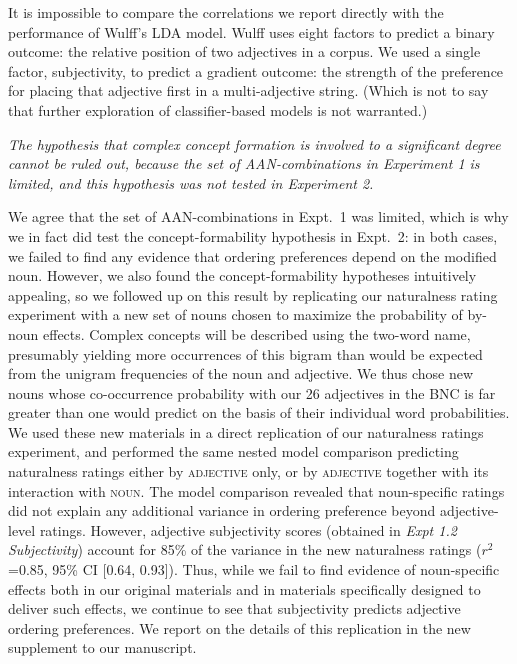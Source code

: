 \documentclass[12pt]{article}
\newcommand{\ndg}[1]{\textcolor{Green}{[ndg: #1]}}
\begin{document}
It is impossible to compare the correlations we report directly with the performance of Wulff's LDA model. Wulff uses eight factors to predict a binary outcome: the relative position of two adjectives in a corpus. We used a single factor, subjectivity, to predict a gradient outcome: the strength of the preference for placing that adjective first in a multi-adjective string.
(Which is not to say that further exploration of classifier-based models is not warranted.) 
	
\item \emph{The hypothesis that complex concept formation is involved to a significant degree cannot be ruled out, because the set of AAN-combinations in Experiment 1 is limited, and this hypothesis was not tested in Experiment 2.}

We agree that the set of AAN-combinations in Expt.~1 was limited, which is why we in fact did test the concept-formability hypothesis in Expt.~2: in both cases, we failed to find any evidence that ordering preferences depend on the modified noun. However, we also found the concept-formability hypotheses intuitively appealing, so we followed up on this result by replicating our naturalness rating experiment with a new set of nouns chosen to maximize the probability of by-noun effects.
Complex concepts will be described using the two-word name, presumably yielding more occurrences of this bigram than would be expected from the unigram frequencies of the noun and adjective.
We thus chose new nouns whose co-occurrence probability with our 26 adjectives in the BNC is far greater than one would predict on the basis of their individual word probabilities. 
We used these new materials in a direct replication of our naturalness ratings experiment, and performed the same nested model comparison predicting naturalness ratings either by \textsc{adjective} only, or by \textsc{adjective} together with its interaction with \textsc{noun}. The model comparison revealed that noun-specific ratings did not explain any additional variance in ordering preference beyond adjective-level ratings. However, adjective subjectivity scores (obtained in \emph{Expt 1.2 Subjectivity}) account for  85\% of the variance in the new naturalness ratings ($r^2${=}0.85, 95\% CI [0.64,  0.93]). Thus, while we fail to find evidence of noun-specific effects both in our original materials and in materials specifically designed to deliver such effects, we continue to see that subjectivity predicts adjective ordering preferences. We report on the details of this replication in the new supplement to our manuscript.
\end{document}
